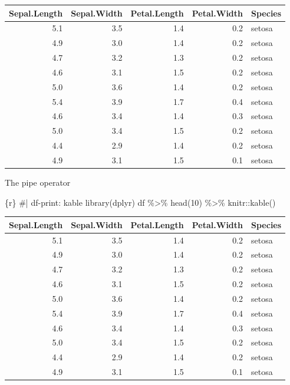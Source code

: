 \documentclass[
  letterpaper,
  DIV=11,
  numbers=noendperiod,
  oneside]{scrreprt}
\newenvironment{Shaded}{\begin{snugshade}}{\end{snugshade}}
\newcommand{\CommentTok}[1]{\textcolor[rgb]{0.37,0.37,0.37}{#1}}
\newcommand{\DecValTok}[1]{\textcolor[rgb]{0.68,0.00,0.00}{#1}}
\newcommand{\FunctionTok}[1]{\textcolor[rgb]{0.28,0.35,0.67}{#1}}
\newcommand{\InformationTok}[1]{\textcolor[rgb]{0.37,0.37,0.37}{#1}}
\newcommand{\NormalTok}[1]{\textcolor[rgb]{0.00,0.23,0.31}{#1}}
\newcommand{\SpecialCharTok}[1]{\textcolor[rgb]{0.37,0.37,0.37}{#1}}
\begin{document}
\begin{longtable}[]{@{}rrrrl@{}}
\toprule()
Sepal.Length & Sepal.Width & Petal.Length & Petal.Width & Species \\
\midrule()
\endhead
5.1 & 3.5 & 1.4 & 0.2 & setosa \\
4.9 & 3.0 & 1.4 & 0.2 & setosa \\
4.7 & 3.2 & 1.3 & 0.2 & setosa \\
4.6 & 3.1 & 1.5 & 0.2 & setosa \\
5.0 & 3.6 & 1.4 & 0.2 & setosa \\
5.4 & 3.9 & 1.7 & 0.4 & setosa \\
4.6 & 3.4 & 1.4 & 0.3 & setosa \\
5.0 & 3.4 & 1.5 & 0.2 & setosa \\
4.4 & 2.9 & 1.4 & 0.2 & setosa \\
4.9 & 3.1 & 1.5 & 0.1 & setosa \\
\bottomrule()
\end{longtable}

The pipe operator

\begin{Shaded}
\begin{Highlighting}[]
\InformationTok{\textasciigrave{}\textasciigrave{}\textasciigrave{}\{r\}}
\CommentTok{\#| df{-}print: kable}
\FunctionTok{library}\NormalTok{(dplyr)}
\NormalTok{df }\SpecialCharTok{\%\textgreater{}\%}
  \FunctionTok{head}\NormalTok{(}\DecValTok{10}\NormalTok{) }\SpecialCharTok{\%\textgreater{}\%}
\NormalTok{  knitr}\SpecialCharTok{::}\FunctionTok{kable}\NormalTok{()}
\InformationTok{\textasciigrave{}\textasciigrave{}\textasciigrave{}}
\end{Highlighting}
\end{Shaded}

\begin{longtable}[]{@{}rrrrl@{}}
\toprule()
Sepal.Length & Sepal.Width & Petal.Length & Petal.Width & Species \\
\midrule()
\endhead
5.1 & 3.5 & 1.4 & 0.2 & setosa \\
4.9 & 3.0 & 1.4 & 0.2 & setosa \\
4.7 & 3.2 & 1.3 & 0.2 & setosa \\
4.6 & 3.1 & 1.5 & 0.2 & setosa \\
5.0 & 3.6 & 1.4 & 0.2 & setosa \\
5.4 & 3.9 & 1.7 & 0.4 & setosa \\
4.6 & 3.4 & 1.4 & 0.3 & setosa \\
5.0 & 3.4 & 1.5 & 0.2 & setosa \\
4.4 & 2.9 & 1.4 & 0.2 & setosa \\
4.9 & 3.1 & 1.5 & 0.1 & setosa \\
\bottomrule()
\end{longtable}
\end{document}
